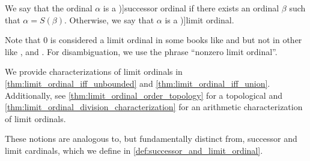 \begin{definition}\label{def:successor_and_limit_ordinal}
  We say that the ordinal \( \alpha \) is a \term[ru=непредельный ординал (\cite[84]{ШеньВерещагин2020НачалаТеорииМножеств})]{successor ordinal} if there exists an ordinal \( \beta \) such that \( \alpha = S(\beta) \). Otherwise, we say that \( \alpha \) is a \term[ru=предельный ординал (\cite[84]{ШеньВерещагин2020НачалаТеорииМножеств})]{limit ordinal}.
\end{definition}
\begin{comments}
  \item Note that \( 0 \) is considered a limit ordinal in some books like
  \cite[20]{Jech2006SetTheory} and
  \cite[84]{ШеньВерещагин2020НачалаТеорииМножеств}
  but not in other like
  \cite[def. I.7.15]{Kunen2013SetTheory},
  \cite[203]{Enderton1977SetTheory} and
  \cite[32]{КусраевКутателадзе2005БулевозначныйАнализ}. For disambiguation, we use the phrase \enquote{nonzero limit ordinal}.

  \item We provide characterizations of limit ordinals in \cref{thm:limit_ordinal_iff_unbounded} and \cref{thm:limit_ordinal_iff_union}. Additionally, see \cref{thm:limit_ordinal_order_topology} for a topological and \cref{thm:limit_ordinal_division_characterization} for an arithmetic characterization of limit ordinals.

  \item These notions are analogous to, but fundamentally distinct from, successor and limit cardinals, which we define in \cref{def:successor_and_limit_ordinal}.
\end{comments}

